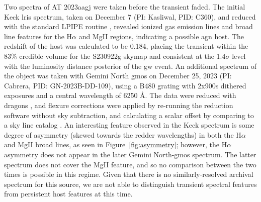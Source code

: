 \documentclass[twocolumn]{aastex631}
\newcommand{\gweventid}{S230922g\xspace}
\begin{document}
Two spectra of AT 2023aagj were taken before the transient faded.
The initial Keck \gls{lris} spectrum, taken on December 7 (PI: Kasliwal, PID: C360), and reduced with the standard LPIPE routine \citep{lpipe}, revealed ionized gas emission lines and broad line features for the H$\alpha$ and MgII regions, indicating a possible \gls{agn} host.
The redshift of the host was calculated to be 0.184, placing the transient within the 83\% credible volume for the \gweventid skymap and consistent at the 1.4$\sigma$ level with the luminosity distance posterior of the \gls{gw} event.
An additional spectrum of the object was taken with Gemini North \gls{gmos} on December 25, 2023 (PI: Cabrera, PID: GN-2023B-DD-109), using a B480 grating with 2x900s dithered exposures and a central wavelength of 6250 \AA.
The data were reduced with \gls{dragons} \citep{labrieDRAGONSDataReduction2019}, and flexure corrections were applied by re-running the reduction software without sky subtraction, and calculating a scalar offset by comparing to a sky line catalog \citep{rousselotNightskySpectralAtlas2000}.
 An interesting feature observed in the Keck spectrum is some degree of asymmetry (skewed towards the redder wavelengths) in both the H$\alpha$ and MgII broad lines, as seen in Figure~\ref{fig:asymmetry}; however, the H$\alpha$ asymmetry does not appear in the later Gemini North-\gls{gmos} spectrum.
 The latter spectrum does not cover the MgII feature, and so no comparison between the two times is possible in this regime.
 Given that there is no similarly-resolved archival spectrum for this source, we are not able to distinguish transient spectral features from persistent host features at this time.
 
\end{document}
